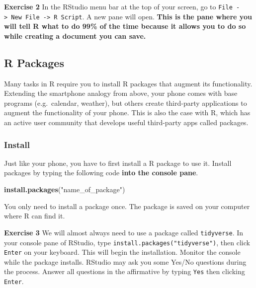 \documentclass[
]{book}
\newenvironment{Shaded}{\begin{snugshade}}{\end{snugshade}}
\newcommand{\KeywordTok}[1]{\textcolor[rgb]{0.13,0.29,0.53}{\textbf{#1}}}
\newcommand{\NormalTok}[1]{#1}
\newcommand{\StringTok}[1]{\textcolor[rgb]{0.31,0.60,0.02}{#1}}
\newenvironment{learncheck}%
{%
  \par\vspace{\baselineskip}\noindent 
  \color{Exercise}\begin{itshape}%
  \par\vspace{\baselineskip}\noindent\ignorespaces 
}%
{%
  \end{itshape}\ignorespacesafterend 
}
\begin{document}
\begin{learncheck}
\textbf{Exercise 2} In the RStudio menu bar at the top of your screen,
go to
\texttt{File\ -\textgreater{}\ New\ File\ -\textgreater{}\ R\ Script}. A
new pane will open. \textbf{This is the pane where you will tell R what
to do 99\% of the time because it allows you to do so while creating a
document you can save.}
\end{learncheck}

\hypertarget{r-packages}{%
\subsection{R Packages}\label{r-packages}}

Many tasks in R require you to install R packages that augment its functionality. Extending the smartphone analogy from above, your phone comes with base programs (e.g.~calendar, weather), but others create third-party applications to augment the functionality of your phone. This is also the case with R, which has an active user community that develops useful third-party apps called packages.

\hypertarget{install}{%
\subsubsection*{Install}\label{install}}

Just like your phone, you have to first install a R package to use it. Install packages by typing the following code \textbf{into the console pane}.

\begin{Shaded}
\begin{Highlighting}[]
\KeywordTok{install.packages}\NormalTok{(}\StringTok{"name_of_package"}\NormalTok{)}
\end{Highlighting}
\end{Shaded}

You only need to install a package once. The package is saved on your computer where R can find it.

\begin{learncheck}
\textbf{Exercise 3} We will almost always need to use a package called
\texttt{tidyverse}. In your console pane of RStudio, type
\texttt{install.packages("tidyverse")}, then click \texttt{Enter} on
your keyboard. This will begin the installation. Monitor the console
while the package installs. RStudio may ask you some Yes/No questions
during the process. Answer all questions in the affirmative by typing
\texttt{Yes} then clicking \texttt{Enter}.
\end{learncheck}
\end{document}
